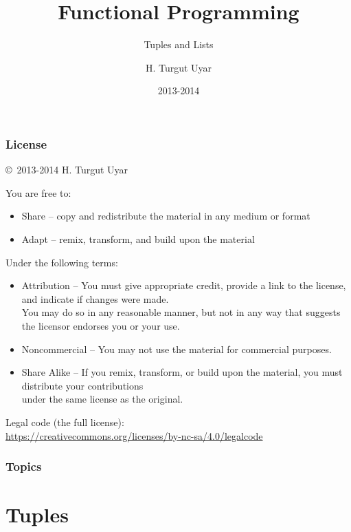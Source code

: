 \documentclass[dvipsnames]{beamer}
\title{Functional Programming}
\subtitle{Tuples and Lists}
\author{H. Turgut Uyar}
\date{2013-2014}
\theoremstyle{plain}
\begin{document}

\begin{frame}
  \titlepage
\end{frame}

\begin{frame}
  \frametitle{License}

  \hfill
  \copyright~2013-2014 H. Turgut Uyar

  \vfill
  \begin{tiny}
    You are free to:
    \begin{itemize}
      \item Share -- copy and redistribute the material in any medium or format
      \item Adapt -- remix, transform, and build upon the material
    \end{itemize}

    Under the following terms:
    \begin{itemize}
      \item Attribution -- You must give appropriate credit, provide a link to
        the license, and indicate if changes were made.\\
        You may do so in any reasonable manner, but not in any way
        that suggests the licensor endorses you or your use.

      \item Noncommercial -- You may not use the material for commercial
        purposes.

      \item Share Alike -- If you remix, transform, or build upon the material,
        you must distribute your contributions\\
        under the same license as the original.
    \end{itemize}
  \end{tiny}

  \vfill
  \begin{small}
    Legal code (the full license):\\
    \url{https://creativecommons.org/licenses/by-nc-sa/4.0/legalcode}
  \end{small}
\end{frame}

\begin{frame}
  \frametitle{Topics}
  \tableofcontents
\end{frame}

\section{Tuples}
\end{document}
